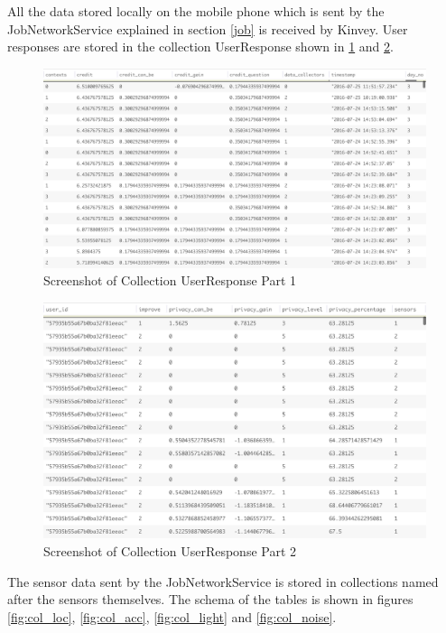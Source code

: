 All the data stored locally on the mobile phone which is sent by the JobNetworkService explained in section \ref{job} is received by Kinvey.
User responses are stored in the collection UserResponse shown in \ref{fig:col_ur_1} and \ref{fig:col_ur_2}.


\begin{figure}[ht!]
\centering
\includegraphics[width=\textwidth,keepaspectratio, height=0.6\textwidth]{./images/collection_ur_1}
\caption{Screenshot of Collection UserResponse Part 1}
\label{fig:col_ur_1}
\end{figure}

\begin{figure}[ht!]
\centering
\includegraphics[width=\textwidth,keepaspectratio,height=0.6\textwidth]{./images/collection_ur_2}
\caption{Screenshot of Collection UserResponse Part 2}
\label{fig:col_ur_2}
\end{figure}

The sensor data sent by the JobNetworkService is stored in collections named after the sensors themselves. The schema of the tables
is shown in figures \ref{fig:col_loc}, \ref{fig:col_acc}, \ref{fig:col_light} and \ref{fig:col_noise}.

